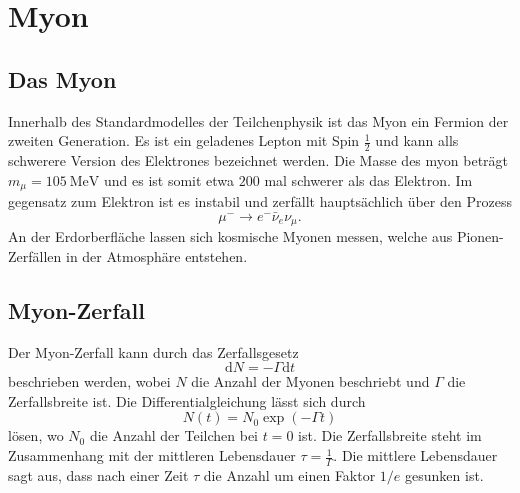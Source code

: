 \section{Myon}
\subsection{Das Myon}
Innerhalb des Standardmodelles der Teilchenphysik ist das Myon ein Fermion der zweiten Generation. Es ist ein geladenes Lepton mit Spin $\frac{1}{2}$  und kann alls schwerere Version des Elektrones bezeichnet werden.
Die Masse des myon beträgt $m_{\mu} = \SI{105}{\MeV}$ und es ist somit etwa $200$ mal schwerer als das Elektron.
Im gegensatz zum Elektron ist es instabil und zerfällt hauptsächlich über den Prozess
\begin{equation*}
    \mu^- \rightarrow e^- \bar \nu_e \nu_{\mu}.
\end{equation*}
An der Erdorberfläche lassen sich kosmische Myonen messen, welche aus Pionen-Zerfällen in der Atmosphäre entstehen.
\subsection{Myon-Zerfall}
Der Myon-Zerfall kann durch das Zerfallsgesetz 
\begin{equation*}
    \mathrm{d} N = -\Gamma \mathrm{d}t
\end{equation*}
beschrieben werden, wobei $N $ die Anzahl der Myonen beschriebt und $\Gamma $ die Zerfallsbreite ist.
Die Differentialgleichung lässt sich durch 
\begin{equation}
    \label{eqn:Zerfall}
    N(t) = N_0 \exp \left(-\Gamma t \right)
\end{equation}
lösen, wo $N_0$ die Anzahl der Teilchen bei $t = 0$ ist. Die Zerfallsbreite steht im Zusammenhang mit der mittleren Lebensdauer $ \tau = \frac{1}{\Gamma}$. Die mittlere Lebensdauer sagt aus, dass nach einer Zeit $\tau$ die Anzahl um einen Faktor $1/e$ gesunken ist.